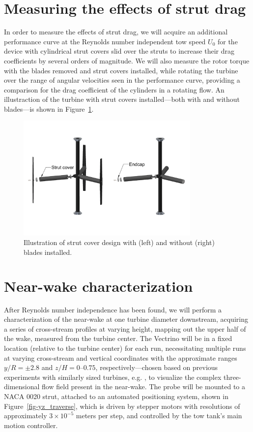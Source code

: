 \documentclass[12pt,letterpaper]{scrreprt}
\begin{document}
\section{Measuring the effects of strut drag}

In order to measure the effects of strut drag, we will acquire an additional
performance curve at the Reynolds number independent tow speed $U_0$ for the
device with cylindrical strut covers slid over the struts to increase their drag
coefficients by several orders of magnitude. We will also measure the rotor
torque with the blades removed and strut covers installed, while rotating the
turbine over the range of angular velocities seen in the performance curve,
providing a comparison for the drag coefficient of the cylinders in a rotating
flow. An illustraction of the turbine with strut covers installed---both with
and without blades---is shown in Figure~\ref{fig-strut_covers}.

\begin{figure}[!ht]
\centering
\includegraphics[width=0.8\textwidth]{Figures/strut_covers}
\caption{Illustration of strut cover design with (left) and without (right)
blades installed.}
\label{fig-strut_covers}
\end{figure}

\section{Near-wake characterization}

After Reynolds number independence has been found, we will perform a
characterization of the near-wake at one turbine diameter downstream, acquiring
a series of cross-stream profiles at varying height, mapping out the upper half
of the wake, measured from the turbine center. The Vectrino will be in a fixed
location (relative to the turbine center) for each run, necessitating multiple
runs at varying cross-stream and vertical coordinates with the approximate
ranges $y/R = \pm 2.8$ and $z/H = 0$--$0.75$, respectively---chosen based on
previous experiments with similarly sized turbines, e.g. \cite{Bachant2013}, to
visualize the complex three-dimensional flow field present in the near-wake. The
probe will be mounted to a NACA 0020 strut, attached to an automated positioning
system, shown in Figure~\ref{fig-yz_traverse}, which is driven by stepper motors
with resolutions of approximately $3 \times 10^{-5}$ meters per step, and
controlled by the tow tank's main motion controller.
\end{document}
